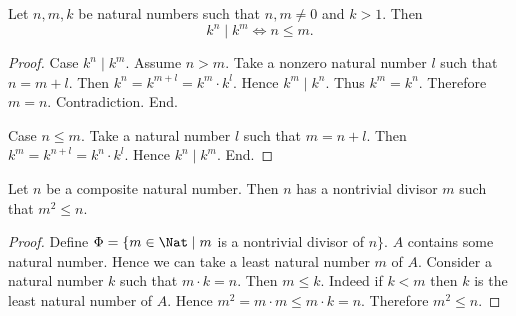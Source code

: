 \begin{forthel}
    \begin{proposition}
      Let $n, m, k$ be natural numbers such that $n, m \neq 0$ and $k > 1$.
      Then \[ k^{n} \mid k^{m} \iff n \leq m. \]
    \end{proposition}
    \begin{proof}
      Case $k^{n} \mid k^{m}$.
        Assume $n > m$.
        Take a nonzero natural number $l$ such that $n = m + l$.
        Then $k^{n}
          = k^{m + l}
          = k^{m} \cdot k^{l}$.
        Hence $k^{m} \mid k^{n}$.
        Thus $k^{m} = k^{n}$.
        Therefore $m = n$.
        Contradiction.
      End.

      Case $n \leq m$.
        Take a natural number $l$ such that $m = n + l$.
        Then $k^{m}
          = k^{n + l}
          = k^{n} \cdot k^{l}$.
        Hence $k^{n} \mid k^{m}$.
      End.
    \end{proof}
  \end{forthel}

  \begin{forthel}
    \begin{proposition}
      Let $n$ be a composite natural number.
      Then $n$ has a nontrivial divisor $m$ such that $m^{2} \leq n$.
    \end{proposition}
    \begin{proof}
      Define $\Phi = \{ m \in \Nat \mid m$ is a nontrivial divisor of $n \}$.
      $A$ contains some natural number.
      Hence we can take a least natural number $m$ of $A$.
      Consider a natural number $k$ such that $m \cdot k = n$.
      Then $m \leq k$.
      Indeed if $k < m$ then $k$ is the least natural number of $A$.
      Hence $m^{2} = m \cdot m \leq m \cdot k = n$.
      Therefore $m^{2} \leq n$.
    \end{proof}
  \end{forthel}

